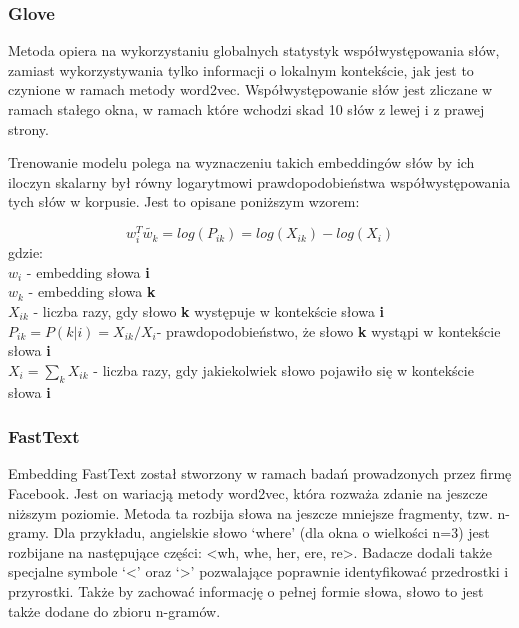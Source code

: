 \subsubsection{Glove}

Metoda opiera na wykorzystaniu globalnych statystyk współwystępowania słów\cite[]{Pennington2014}, zamiast wykorzystywania tylko informacji o lokalnym kontekście, jak jest to czynione w ramach metody word2vec. Współwystępowanie słów jest zliczane w ramach stałego okna, w ramach które wchodzi skad 10 słów z lewej i z prawej strony.

Trenowanie modelu polega na wyznaczeniu takich embeddingów słów by ich iloczyn skalarny był równy logarytmowi prawdopodobieństwa współwystępowania tych słów w korpusie. Jest to opisane poniższym wzorem:


$$w_i^T \tilde{w_k}   = log(P_{ik}) = log(X_{ik}) - log(X_i)$$
gdzie: \\
$w_i$ - embedding słowa \textbf{i} \\
$w_k$ - embedding słowa  \textbf{k} \\
$X_{ik}$ - liczba razy, gdy słowo \textbf{k} występuje w kontekście słowa \textbf{i} \\
$P_{ik} = P(k|i) = X_{ik}/X_i $- prawdopodobieństwo, że słowo \textbf{k} wystąpi w kontekście słowa \textbf{i}\\
$X_{i} = \sum_{k} X_{ik} $ - liczba razy, gdy jakiekolwiek słowo pojawiło się w kontekście słowa  \textbf{i} \\




\subsubsection{FastText}

Embedding FastText został stworzony w ramach badań prowadzonych przez firmę Facebook\cite{Bojanowski2016}. Jest on wariacją metody word2vec, która rozważa zdanie na jeszcze niższym poziomie. Metoda ta rozbija słowa na jeszcze mniejsze fragmenty, tzw. n-gramy. Dla przykładu, angielskie słowo ‘where’ (dla okna o wielkości n=3) jest rozbijane na następujące części: <wh, whe, her, ere, re>. Badacze dodali także specjalne symbole ‘<’ oraz ‘>’ pozwalające poprawnie identyfikować przedrostki i przyrostki. Także by zachować informację o pełnej formie słowa, słowo to jest także dodane do zbioru n-gramów.

